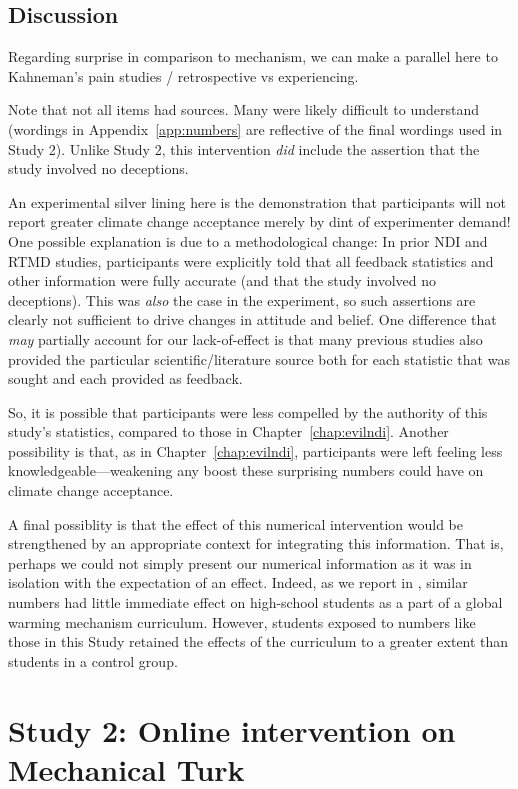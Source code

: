 \subsection{Discussion}

Regarding surprise in comparison to mechanism, we can make a parallel here to
Kahneman's pain studies / retrospective vs experiencing.

Note that not all items had sources. Many were likely difficult to understand
(wordings in Appendix~\ref{app:numbers} are reflective of the final wordings
used in Study 2). Unlike Study 2, this intervention \emph{did} include the
assertion that the study involved no deceptions.

An experimental silver lining here is the demonstration that
participants will not report greater climate change acceptance merely by dint of
experimenter demand! One possible explanation is due to a methodological change:
In prior NDI and RTMD studies, participants were explicitly told that all
feedback statistics and other information were fully accurate (and that the
study involved no deceptions). This was \emph{also} the case in the experiment,
so such assertions are clearly not sufficient to drive changes in attitude and
belief.  One difference that \emph{may} partially account for our lack-of-effect
is that many previous studies also provided the particular scientific/literature
source both for each statistic that was sought and each provided as feedback.

So, it is possible that participants were less compelled by the authority of
this study’s statistics, compared to those in Chapter~\ref{chap:evilndi}.
Another possibility is that, as in Chapter~\ref{chap:evilndi}, participants were
left feeling less knowledgeable—weakening any boost these surprising numbers
could have on climate change acceptance.  

A final possiblity is that the effect of this numerical intervention would be
strengthened by an appropriate context for integrating this information. That
is, perhaps we could not simply present our numerical information as it was in
isolation with the expectation of an effect. Indeed, as we report in
\cite{clark_knowledge_inpress}, similar numbers had little immediate effect on
high-school students as a part of a global warming mechanism curriculum.
However, students exposed to numbers like those in this Study retained the
effects of the curriculum to a greater extent than students in a control group.

\section{Study 2: Online intervention on Mechanical Turk}

